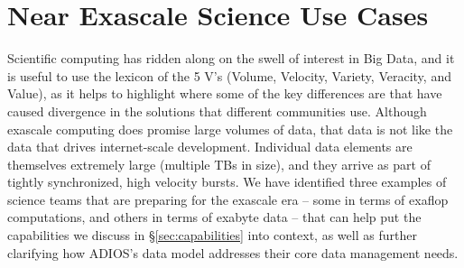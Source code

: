 









\section{Near Exascale Science Use Cases }
\label{sec:usecases}
 Scientific computing has ridden along on the swell of interest in Big Data, and it is useful to use the lexicon of the 5 V's (Volume, Velocity, Variety, Veracity, and Value), as it helps to highlight where some of the key differences are that have caused divergence in the solutions that different communities use.  Although exascale computing does promise large volumes of data, that data is not like the data that drives internet-scale development.  Individual data elements are themselves extremely large (multiple TBs in size), and they arrive as part of tightly synchronized, high velocity bursts.  
 We have identified three examples of science teams that are preparing for the exascale era -- some in terms of exaflop computations, and others in terms of exabyte data -- that can help put the capabilities we discuss in \S\ref{sec:capabilities} into context, as well as further clarifying how ADIOS's data model addresses their core data management needs.


